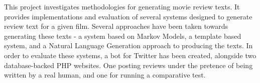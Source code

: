 This project investigates methodologies for generating movie review texts. It provides implementations and evaluation of several systems designed to generate review text for a given film. Several approaches have been taken towards generating these texts - a system based on Markov Models, a template based system, and a Natural Language Generation approach to producing the texts. In order to evaluate these systems, a bot for Twitter has been created, alongside two database-backed PHP websites. One posting reviews under the pretence of being written by a real human, and one for running a comparative test.

